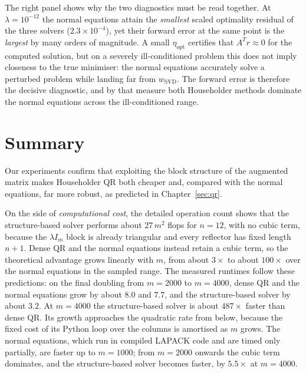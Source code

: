 \noindent The right panel shows why the two diagnostics must be read together.
At $\lambda=10^{-12}$ the normal equations attain the \emph{smallest} scaled
optimality residual of the three solvers ($2.3\times10^{-4}$), yet their
forward error at the same point is the \emph{largest} by many orders of
magnitude. A small $\eta_{\mathrm{opt}}$ certifies that $A^Tr\approx0$ for the
computed solution, but on a severely ill-conditioned problem this does not
imply closeness to the true minimiser: the normal equations accurately solve a
perturbed problem while landing far from $w_{\mathrm{SVD}}$. The forward error
is therefore the decisive diagnostic, and by that measure both Householder
methods dominate the normal equations across the ill-conditioned range.

\section{Summary}
\label{sec:qr_summary}

\noindent Our experiments confirm that exploiting the block structure of the
augmented matrix makes Householder QR both cheaper and, compared with the
normal equations, far more robust, as predicted in Chapter~\ref{sec:qr}.

\noindent On the side of \emph{computational cost}, the detailed operation count
shows that the structure-based solver performs about $27\,m^2$ flops for
$n=12$, with no cubic term, because the $\lambda I_m$ block is already
triangular and every reflector has fixed length $n+1$. Dense QR and the
normal equations instead retain a cubic term, so the theoretical advantage
grows linearly with $m$, from about $3\times$ to about $100\times$ over the
normal equations in the sampled range. The measured runtimes follow these predictions: on the final doubling from
$m=2000$ to $m=4000$, dense QR and the normal equations grow by about $8.0$
and $7.7$, and the structure-based solver by about $3.2$. At $m=4000$ the
structure-based solver is about $487\times$ faster than dense QR.
Its growth approaches the quadratic rate from below, because the fixed cost
of its Python loop over the columns is amortised as $m$ grows. The normal
equations, which run in compiled LAPACK code and are timed only partially,
are faster up to $m=1000$; from $m=2000$ onwards the cubic term dominates, and
the structure-based solver becomes faster, by $5.5\times$ at $m=4000$.

